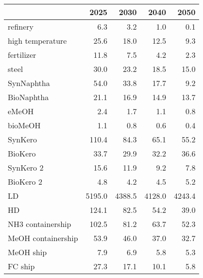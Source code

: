 \begin{tabular}{lrrrr}
\toprule
 & 2025 & 2030 & 2040 & 2050 \\
\midrule
refinery & 6.3 & 3.2 & 1.0 & 0.1 \\
high temperature & 25.6 & 18.0 & 12.5 & 9.3 \\
fertilizer & 11.8 & 7.5 & 4.2 & 2.3 \\
steel & 30.0 & 23.2 & 18.5 & 15.0 \\
SynNaphtha & 54.0 & 33.8 & 17.7 & 9.2 \\
BioNaphtha & 21.1 & 16.9 & 14.9 & 13.7 \\
eMeOH & 2.4 & 1.7 & 1.1 & 0.8 \\
bioMeOH & 1.1 & 0.8 & 0.6 & 0.4 \\
SynKero & 110.4 & 84.3 & 65.1 & 55.2 \\
BioKero & 33.7 & 29.9 & 32.2 & 36.6 \\
SynKero 2 & 15.6 & 11.9 & 9.2 & 7.8 \\
BioKero 2 & 4.8 & 4.2 & 4.5 & 5.2 \\
LD & 5195.0 & 4388.5 & 4128.0 & 4243.4 \\
HD & 124.1 & 82.5 & 54.2 & 39.0 \\
NH3 containership & 102.5 & 81.2 & 63.7 & 52.3 \\
MeOH containership & 53.9 & 46.0 & 37.0 & 32.7 \\
MeOH ship & 7.9 & 6.9 & 5.8 & 5.3 \\
FC ship & 27.3 & 17.1 & 10.1 & 5.8 \\
\bottomrule
\end{tabular}
